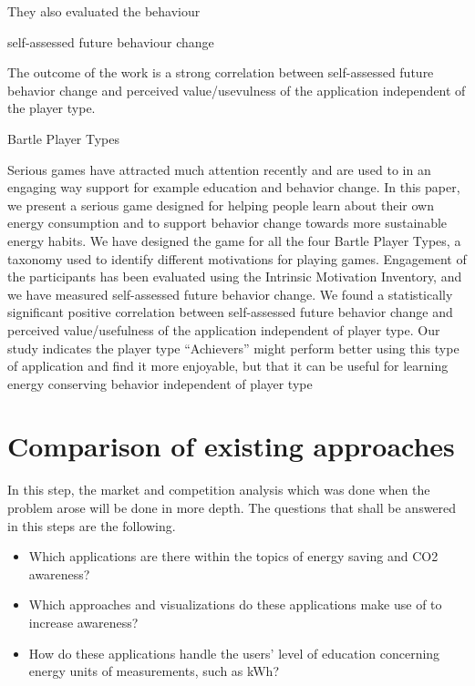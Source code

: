 They also evaluated the behaviour 

self-assessed future behaviour change 

The outcome of the work is a strong correlation between self-assessed future behavior change and perceived value/usevulness of the application independent of the player type.

Bartle Player Types

Serious games have attracted much attention recently and are used to in an engaging way support for example education and behavior change. In this paper, we present a serious game designed for helping people learn about their own energy consumption and to support behavior change towards more sustainable energy habits. We have designed the game for all the four Bartle Player Types, a taxonomy used to identify different motivations for playing games. Engagement of the participants has been evaluated using the Intrinsic Motivation Inventory, and we have measured self-assessed future behavior change. We found a statistically significant positive correlation between self-assessed future behavior change and perceived value/usefulness of the application independent of player type. Our study indicates the player type “Achievers” might perform better using this type of application and find it more enjoyable, but that it can be useful for learning energy conserving behavior independent of player type





\section{Comparison of existing approaches}
In this step, the market and competition analysis which was done when the problem arose will be done in more depth. The questions that shall be answered in this steps are the following.
\begin{itemize}
	\item Which applications are there within the topics of energy saving and CO2 awareness?
	\item Which approaches and visualizations do these applications make use of to increase awareness?
	\item How do these applications handle the users' level of education concerning energy units of measurements, such as kWh?
\end{itemize}

\cite{jeon2008user}



